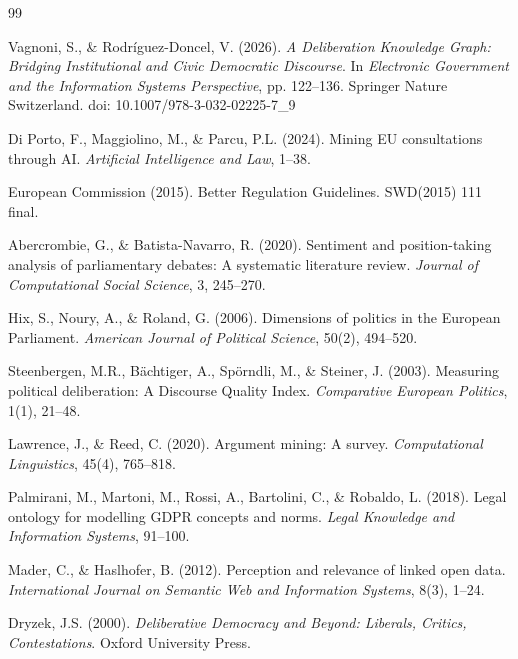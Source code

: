 \documentclass[sigconf,natbib]{acmart}
\begin{document}
\begin{thebibliography}{99}

Vagnoni, S., \& Rodr\'iguez-Doncel, V. (2026).
\textit{A Deliberation Knowledge Graph: Bridging Institutional and Civic Democratic Discourse}.
In \textit{Electronic Government and the Information Systems Perspective}, pp. 122--136.
Springer Nature Switzerland.
doi: 10.1007/978-3-032-02225-7_9

Di Porto, F., Maggiolino, M., \& Parcu, P.L. (2024).
Mining EU consultations through AI.
\textit{Artificial Intelligence and Law}, 1--38.

European Commission (2015).
Better Regulation Guidelines.
SWD(2015) 111 final.

Abercrombie, G., \& Batista-Navarro, R. (2020).
Sentiment and position-taking analysis of parliamentary debates: A systematic literature review.
\textit{Journal of Computational Social Science}, 3, 245--270.

Hix, S., Noury, A., \& Roland, G. (2006).
Dimensions of politics in the European Parliament.
\textit{American Journal of Political Science}, 50(2), 494--520.

Steenbergen, M.R., B\"achtiger, A., Sp\"orndli, M., \& Steiner, J. (2003).
Measuring political deliberation: A Discourse Quality Index.
\textit{Comparative European Politics}, 1(1), 21--48.

Lawrence, J., \& Reed, C. (2020).
Argument mining: A survey.
\textit{Computational Linguistics}, 45(4), 765--818.

Palmirani, M., Martoni, M., Rossi, A., Bartolini, C., \& Robaldo, L. (2018).
Legal ontology for modelling GDPR concepts and norms.
\textit{Legal Knowledge and Information Systems}, 91--100.

Mader, C., \& Haslhofer, B. (2012).
Perception and relevance of linked open data.
\textit{International Journal on Semantic Web and Information Systems}, 8(3), 1--24.

Dryzek, J.S. (2000).
\textit{Deliberative Democracy and Beyond: Liberals, Critics, Contestations}.
Oxford University Press.


\end{thebibliography}
\end{document}
